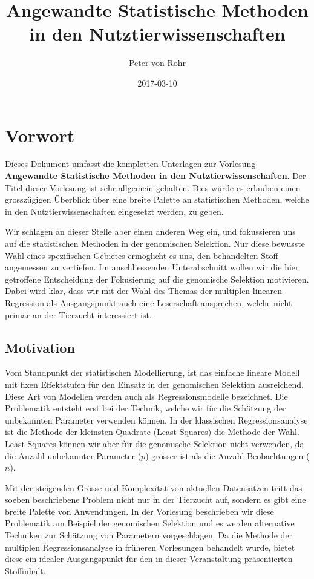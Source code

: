 \documentclass[]{book}
\title{Angewandte Statistische Methoden in den Nutztierwissenschaften}
\author{Peter von Rohr}
\date{2017-03-10}
\begin{document}
\maketitle

{
\setcounter{tocdepth}{1}
\tableofcontents
}
\chapter*{Vorwort}\label{vorwort}

Dieses Dokument umfasst die kompletten Unterlagen zur Vorlesung
\textbf{Angewandte Statistische Methoden in den Nutztierwissenschaften}.
Der Titel dieser Vorlesung ist sehr allgemein gehalten. Dies würde es
erlauben einen grosszügigen Überblick über eine breite Palette an
statistischen Methoden, welche in den Nutztierwissenschaften eingesetzt
werden, zu geben.

Wir schlagen an dieser Stelle aber einen anderen Weg ein, und
fokussieren uns auf die statistischen Methoden in der genomischen
Selektion. Nur diese bewusste Wahl eines spezifischen Gebietes
ermöglicht es uns, den behandelten Stoff angemessen zu vertiefen. Im
anschliessenden Unterabschnitt wollen wir die hier getroffene
Entscheidung der Fokusierung auf die genomische Selektion motivieren.
Dabei wird klar, dass wir mit der Wahl des Themas der multiplen linearen
Regression als Ausgangspunkt auch eine Leserschaft ansprechen, welche
nicht primär an der Tierzucht interessiert ist.

\section*{Motivation}\label{motivation}

Vom Standpunkt der statistischen Modellierung, ist das einfache lineare
Modell mit fixen Effektstufen für den Einsatz in der genomischen
Selektion ausreichend. Diese Art von Modellen werden auch als
Regressionsmodelle bezeichnet. Die Problematik entsteht erst bei der
Technik, welche wir für die Schätzung der unbekannten Parameter
verwenden können. In der klassischen Regressionsanalyse ist die Methode
der kleinsten Quadrate (Least Squares) die Methode der Wahl. Least
Squares können wir aber für die genomische Selektion nicht verwenden, da
die Anzahl unbekannter Parameter (\(p\)) grösser ist als die Anzahl
Beobachtungen (\(n\)).

Mit der steigenden Grösse und Komplexität von aktuellen Datensätzen
tritt das soeben beschriebene Problem nicht nur in der Tierzucht auf,
sondern es gibt eine breite Palette von Anwendungen. In der Vorlesung
beschrieben wir diese Problematik am Beispiel der genomischen Selektion
und es werden alternative Techniken zur Schätzung von Parametern
vorgeschlagen. Da die Methode der multiplen Regressionsanalyse in
früheren Vorlesungen behandelt wurde, bietet diese ein idealer
Ausgangspunkt für den in dieser Veranstaltung präsentierten Stoffinhalt.
\end{document}
